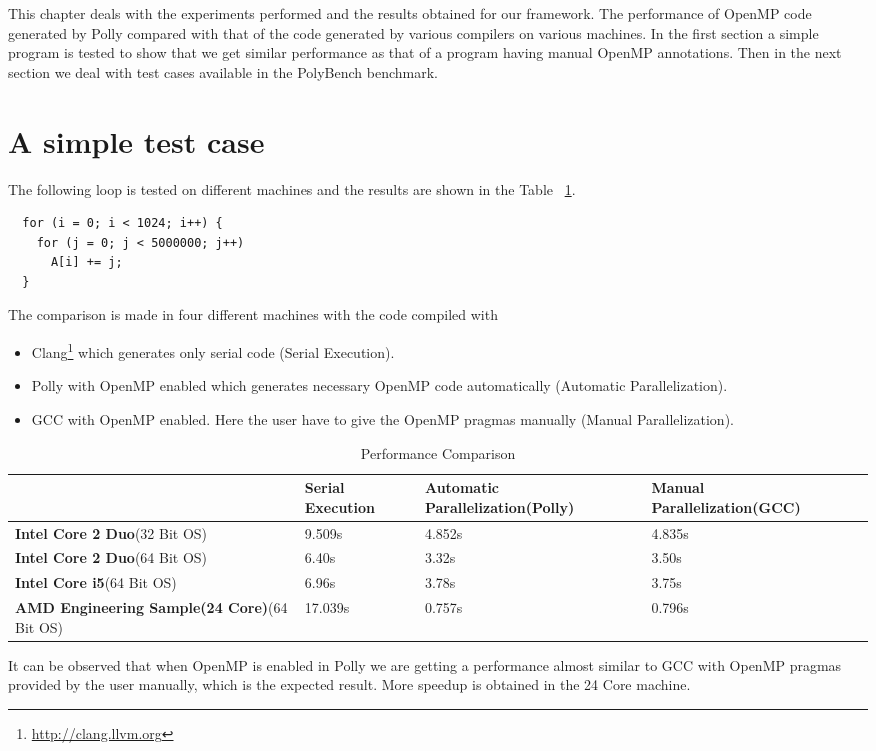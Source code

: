 \label{chap:testing}
This chapter deals with the experiments performed and the results obtained for our framework. The
performance of OpenMP code generated by Polly compared with that of the code generated
by various compilers on various machines. In the first section a simple program
is tested to show that we get similar performance as that of a program having manual OpenMP
annotations. Then in the next section we deal with test cases available in the PolyBench
benchmark.
\section{A simple test case}
The following loop is tested on different machines and the results are shown in the Table ~\ref{table:simple}.
{\footnotesize
\begin{lstlisting}
  for (i = 0; i < 1024; i++) {
    for (j = 0; j < 5000000; j++)
      A[i] += j;
  }
\end{lstlisting}
}
The comparison is made in four different machines with the code compiled with
\begin{itemize}
\item Clang\footnote{\url{http://clang.llvm.org}} which generates only serial code (Serial Execution).
\item Polly with OpenMP enabled which generates necessary OpenMP code automatically (Automatic
      Parallelization).
\item GCC with OpenMP enabled. Here the user have to give the OpenMP pragmas manually (Manual Parallelization).
\end{itemize}
\begin{table}[h]
\begin{center}
{\footnotesize
\begin{tabular}{| l | p{2cm} | p{2cm} | p{2cm} | p{2cm} |}
\hline
& \textbf{Serial Execution} & \textbf{Automatic Parallelization(Polly)} & \textbf{Manual Parallelization(GCC)} \\ \hline
\textbf{Intel Core 2 Duo}(32 Bit OS)& 9.509s & 4.852s & 4.835s \\ \hline
\textbf{Intel Core 2 Duo}(64 Bit OS)& 6.40s  & 3.32s & 3.50s\\ \hline
\textbf{Intel Core i5}(64 Bit OS)   & 6.96s  & 3.78s & 3.75s\\ \hline
\textbf{AMD Engineering Sample(24 Core)}(64 Bit OS)   & 17.039s & 0.757s & 0.796s\\
\hline
\end{tabular}
}
\end{center}
\caption{Performance Comparison}
\label{table:simple}
\end{table}
It can be observed that when OpenMP is enabled in Polly we are getting a performance
almost similar to GCC  with OpenMP pragmas provided by the user manually, which is the expected result. More
speedup is obtained in the 24 Core machine.


